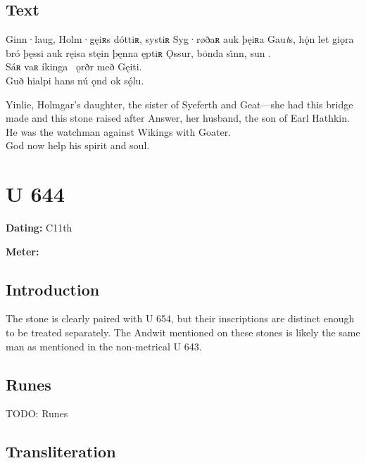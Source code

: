 \subsection{Text}

\bpg\bpa[0]%
\startsub Ginn·laug, Holm·gęiʀs dóttiʀ, systiʀ Syg·røðaʀ auk þęiʀa Gau\emph{t}s, hǫ̇n let giǫra bró þęssi auk ręisa stęin þęnna ęptiʀ Ǫssur, bȯnda si̇nn, sun .\endsub \\
Sáʀ vaʀ íkinga \hld\ ǫrðr með Gęiti. \\
Guð hialpi hans nú ǫnd ok sǫ́lu.\epa

\bpb Yinlie, Holmgar’s daughter, the sister of Syeferth and Geat---she had this bridge made and this stone raised after Answer, her husband, the son of Earl Hathkin. \\
He was the watchman against Wikings with Goater. \\
God now help his spirit and soul.\epb\epg

\sectionline\clearpage


\section{U 644}

\begin{flushright}%
\textbf{Dating:} C11th

\textbf{Meter:} \Fornyrdislag
\end{flushright}%

\subsection{Introduction}

The stone is clearly paired with U 654, but their inscriptions are distinct enough to be treated separately.  The Andwit mentioned on these stones is likely the same man as mentioned in the non-metrical U 643.

\subsection{Runes}

TODO: Runes%

\subsection{Transliteration}


